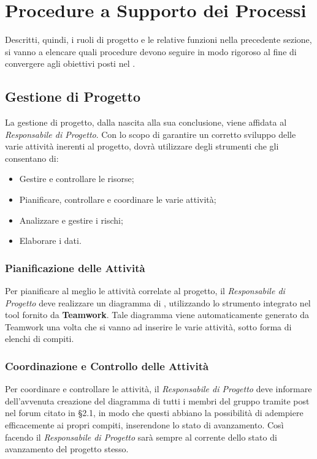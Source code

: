 \section{Procedure a Supporto dei Processi}

Descritti, quindi, i ruoli di progetto e le relative funzioni nella precedente sezione, si vanno a elencare quali procedure devono seguire in modo rigoroso al fine di convergere agli obiettivi posti nel \PianoDiQualifica.

\subsection{Gestione di Progetto}

La gestione di progetto, dalla nascita alla sua conclusione, viene affidata al \textit{Responsabile di Progetto}. Con lo scopo di garantire un corretto sviluppo delle varie attività inerenti al progetto, dovrà utilizzare degli strumenti che gli consentano di:

\begin{itemize}
\item Gestire e controllare le risorse;
\item Pianificare, controllare e coordinare le varie attività;
\item Analizzare e gestire i rischi;
\item Elaborare i dati.
\end{itemize}

\subsubsection{Pianificazione delle Attività}
Per pianificare al meglio le attività correlate al progetto, il \textit{Responsabile di Progetto} deve realizzare un diagramma di , utilizzando lo strumento integrato nel tool fornito da \textbf{Teamwork}. Tale diagramma viene automaticamente generato da Teamwork una volta che si vanno ad inserire le varie attività, sotto forma di elenchi di compiti.

\subsubsection{Coordinazione e Controllo delle Attività}
Per coordinare e controllare le attività, il \textit{Responsabile di Progetto} deve informare dell'avvenuta creazione del diagramma di  tutti i membri del gruppo tramite post nel forum citato in §2.1, in modo che questi abbiano la possibilità di adempiere efficacemente ai propri compiti, inserendone lo stato di avanzamento. Così facendo il \textit{Responsabile di Progetto} sarà sempre al corrente dello stato di avanzamento del progetto stesso.

